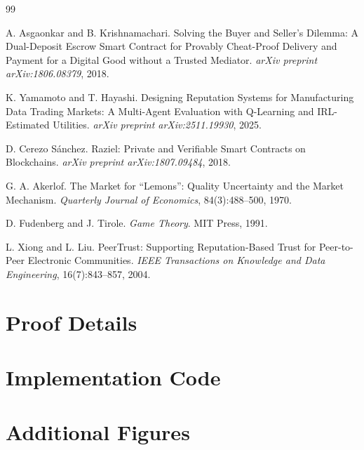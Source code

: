 \documentclass[11pt,a4paper]{article}
\theoremstyle{definition}
\theoremstyle{remark}
\begin{document}
\begin{thebibliography}{99}

A. Asgaonkar and B. Krishnamachari.
\newblock Solving the Buyer and Seller's Dilemma: A Dual-Deposit Escrow Smart Contract for Provably Cheat-Proof Delivery and Payment for a Digital Good without a Trusted Mediator.
\newblock \textit{arXiv preprint arXiv:1806.08379}, 2018.

K. Yamamoto and T. Hayashi.
\newblock Designing Reputation Systems for Manufacturing Data Trading Markets: A Multi-Agent Evaluation with Q-Learning and IRL-Estimated Utilities.
\newblock \textit{arXiv preprint arXiv:2511.19930}, 2025.

D. Cerezo Sánchez.
\newblock Raziel: Private and Verifiable Smart Contracts on Blockchains.
\newblock \textit{arXiv preprint arXiv:1807.09484}, 2018.

G. A. Akerlof.
\newblock The Market for ``Lemons'': Quality Uncertainty and the Market Mechanism.
\newblock \textit{Quarterly Journal of Economics}, 84(3):488--500, 1970.

D. Fudenberg and J. Tirole.
\newblock \textit{Game Theory}.
\newblock MIT Press, 1991.

L. Xiong and L. Liu.
\newblock PeerTrust: Supporting Reputation-Based Trust for Peer-to-Peer Electronic Communities.
\newblock \textit{IEEE Transactions on Knowledge and Data Engineering}, 16(7):843--857, 2004.

\end{thebibliography}


\appendix

\section{Proof Details}
\label{app:proofs}


\section{Implementation Code}
\label{app:code}


\section{Additional Figures}
\label{app:figures}

\end{document}
